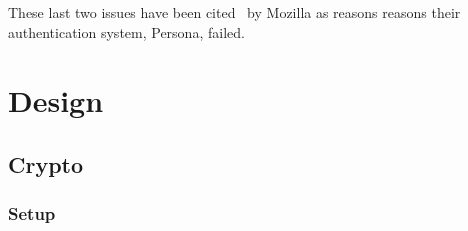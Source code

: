 \documentclass[pdftex,12pt,a4papaer]{report}
\begin{document}
These last two issues have been cited~\cite{persona-fail} by Mozilla as reasons
reasons their authentication system, Persona, failed.

\chapter{Design}

\section{Crypto}

\subsection{Setup}

%
%
%
%
%
%
\end{document}
